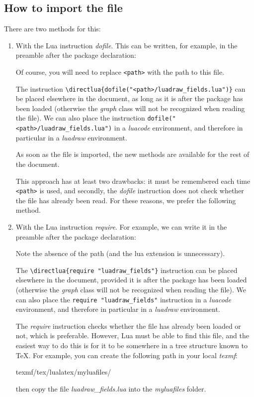 \subsection{How to import the file}

There are two methods for this:

\begin{enumerate}
\item With the Lua instruction \emph{dofile}. This can be written, for example, in the preamble after the package declaration:
\begin{TeXcode}
\usepackage[]{luadraw}
\end{TeXcode}
Of course, you will need to replace \verb|<path>| with the path to this file.

The instruction \verb|\directlua{dofile("<path>/luadraw_fields.lua")}| can be placed elsewhere in the document, as long as it is after the package has been loaded (otherwise the \emph{graph} class will not be recognized when reading the file). We can also place the instruction \verb|dofile("<path>/luadraw_fields.lua")| in a \emph{luacode} environment, and therefore in particular in a \emph{luadraw} environment.

As soon as the file is imported, the new methods are available for the rest of the document.

This approach has at least two drawbacks: it must be remembered each time \verb|<path>| is used, and secondly, the \emph{dofile} instruction does not check whether the file has already been read. For these reasons, we prefer the following method.

\item With the Lua instruction \emph{require}. For example, we can write it in the preamble after the package declaration:
\begin{TeXcode}
\usepackage[]{luadraw}
\end{TeXcode}
Note the absence of the path (and the lua extension is unnecessary).

The \verb|\directlua{require "luadraw_fields"}| instruction can be placed elsewhere in the document, provided it is after the package has been loaded (otherwise the \emph{graph} class will not be recognized when reading the file). We can also place the \verb|require "luadraw_fields"| instruction in a \emph{luacode} environment, and therefore in particular in a \emph{luadraw} environment.

The \emph{require} instruction checks whether the file has already been loaded or not, which is preferable. However, Lua must be able to find this file, and the easiest way to do this is for it to be somewhere in a tree structure known to TeX. For example, you can create the following path in your local \emph{texmf}:
\begin{TeXcode}
texmf/tex/lualatex/myluafiles/
\end{TeXcode}
then copy the file \emph{luadraw\_fields.lua} into the \emph{myluafiles} folder.
\end{enumerate}

